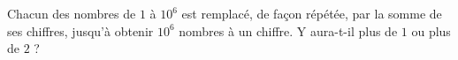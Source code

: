 Chacun des nombres de $1$ à $10^6$ est remplacé, de façon répétée, par la somme de ses chiffres, jusqu'à obtenir $10^6$ nombres à un chiffre. Y aura-t-il plus de $1$ ou plus de $2$ ?
